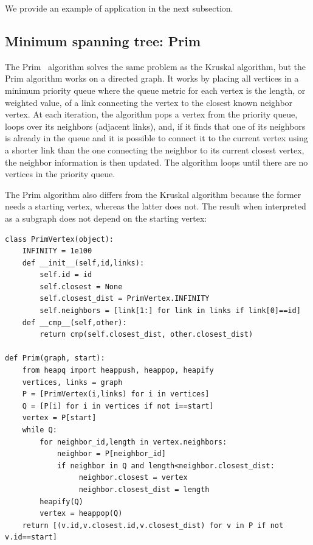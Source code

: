 \documentclass[justified,sixbynine]{tufte-book}
\def\ft{\small\tt}
\theoremstyle{plain}%
\theoremstyle{definition}
\theoremstyle{remark}
\begin{document}
\begin{fullwidth}
We provide an example of application in the next subsection.

\goodbreak\subsection{Minimum spanning tree: Prim}

The Prim~\cite{prim} algorithm solves the same problem as the Kruskal algorithm, but the Prim algorithm works on a directed graph. It works by placing all vertices in a minimum priority queue where the queue metric for each vertex is the length, or weighted value, of a link connecting the vertex to the closest known neighbor vertex. At each iteration, the algorithm pops a vertex from the priority queue, loops over its neighbors (adjacent links), and, if it finds that one of its neighbors is already in the queue and it is possible to connect it to the current vertex using a shorter link than the one connecting the neighbor to its current closest vertex, the neighbor information is then updated. The algorithm loops until there are no vertices in the priority queue.

The Prim algorithm also differs from the Kruskal algorithm because the former needs a starting vertex, whereas the latter does not. The result when interpreted as a subgraph does not depend on the starting vertex:

\begin{lstlisting}[caption={in file: {\ft nlib.py}}]
class PrimVertex(object):
    INFINITY = 1e100
    def __init__(self,id,links):
        self.id = id
        self.closest = None
        self.closest_dist = PrimVertex.INFINITY
        self.neighbors = [link[1:] for link in links if link[0]==id]
    def __cmp__(self,other):
        return cmp(self.closest_dist, other.closest_dist)

def Prim(graph, start):
    from heapq import heappush, heappop, heapify
    vertices, links = graph
    P = [PrimVertex(i,links) for i in vertices]
    Q = [P[i] for i in vertices if not i==start]
    vertex = P[start]
    while Q:
        for neighbor_id,length in vertex.neighbors:
            neighbor = P[neighbor_id]
            if neighbor in Q and length<neighbor.closest_dist:
                 neighbor.closest = vertex
                 neighbor.closest_dist = length
        heapify(Q)
        vertex = heappop(Q)
    return [(v.id,v.closest.id,v.closest_dist) for v in P if not v.id==start]
\end{lstlisting}


\end{fullwidth}
\end{document}
